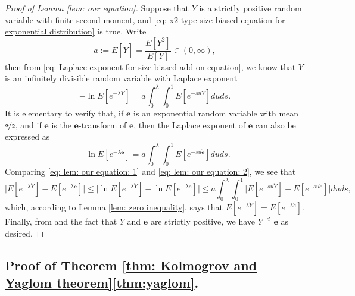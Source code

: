 \documentclass[12pt,a4paper]{amsart}
\numberwithin{equation}{section}
\begin{document}
\begin{proof}[Proof of Lemma \ref{lem: our equation}]
	Suppose that $Y$ is a strictly positive random variable with finite second moment, and \eqref{eq: x2 type size-biased equation for exponential distribution} is true.
	Write 
\[
	a 
	:= E[\dot Y] 
	= \frac{ E[Y^2] }{ E[Y] } \in (0,\infty),
\]	
	then from \eqref{eq: Laplace exponent for size-biased add-on equation}, we know that $\dot Y$ is an infinitely divisible random variable with Laplace exponent
\begin{equation}\label{eq: lem: our equation: 1}
	-\ln E[ e^{-\lambda \dot Y}] 
	=  a  \int_0^\lambda \int_0^1 E [e^{-s u \dot Y}] du ds.
\end{equation}
	It is elementary to verify that, if $\mathbf e$ is an exponential random variable with mean $\nicefrac{a}{2}$, and if $\dot {\mathbf e}$ is the $\mathbf e$-transform of $\mathbf e$, then the Laplace exponent of $\dot {\mathbf e}$ can also be expressed as
\begin{equation}\label{eq: lem: our equation: 2}
	-\ln E[ e^{-\lambda \dot {\mathbf e}}] 
	=  a  \int_0^\lambda \int_0^1 E [e^{-s u \dot {\mathbf e}}] du ds.
\end{equation}
	Comparing \eqref{eq: lem: our equation: 1} and \eqref{eq: lem: our equation: 2}, we see that
\[
	\big|E[ e^{-\lambda \dot Y}] - E[ e^{-\lambda \dot {\mathbf e}}] \big| 
	\leq  \big|\ln E[ e^{-\lambda \dot Y}] - \ln E[ e^{-\lambda \dot {\mathbf e}}] \big| 
	\leq  a  \int_0^\lambda \int_0^1 \big| E [e^{-s u \dot Y}] - E [e^{-s u \dot {\mathbf e}}] \big| du ds,
\]
	which, according to Lemma \ref{lem: zero inequality}, says that $E[e^{-\lambda \dot Y}] = E[e^{- \lambda \dot e}]$.
	Finally, from \cite[Lemma 2.6]{ArratiaGoldsteinKochman2013} and the fact that $Y$ and $\mathbf e$ are strictly positive, we have
	$Y \overset{d} = \mathbf e$ as desired.
\end{proof}

\subsection{Proof of Theorem \ref{thm: Kolmogrov and Yaglom theorem}\eqref{thm:yaglom}.}
\label{sec: proof of yaglom's theorem}
\end{document}
